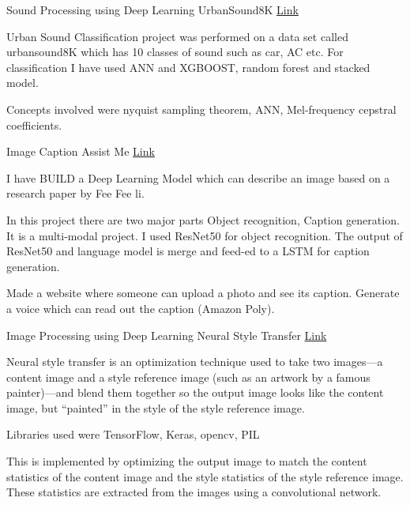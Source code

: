 \begin{cventries}
  \cventry
    {Sound Processing using Deep Learning} %
    {UrbanSound8K} %
    {\href{https://github.com/ravising-h/Urbansound8k}{Link}} %
    {} %
    {
      \begin{cvitems} %
        \item Urban Sound Classification project was performed on a data set called urbansound8K which has 10 classes of sound such as car, AC etc. For classification I have used ANN and XGBOOST, random forest and stacked model.
        \item  Concepts involved were nyquist sampling theorem, ANN, Mel-frequency cepstral coefficients.
      \end{cvitems}
    }
  \cventry
    {Image Caption} %
    {Assist Me} %
    {\href{https://github.com/ravising-h/AssistME}{Link}} %
    {} %
    {
      \begin{cvitems} %
       \item I have BUILD a Deep Learning Model which can describe an image based on a research paper by Fee Fee li.
        \item In this project there are two major parts Object recognition, Caption generation. It is a multi-modal project. I used ResNet50 for object  recognition.  The output  of ResNet50 and language model is merge and feed-ed to a LSTM for caption generation.
        \item  Made a website where someone can upload a photo and see its caption. Generate a voice which can read out the caption (Amazon Poly).
      \end{cvitems}
    }
    

  \cventry
    {Image Processing using Deep Learning} %
    {Neural Style Transfer} %
    {\href{https://github.com/ravising-h/Neural-Style-Transfer}{Link}} %
    {} %
    {
      \begin{cvitems} %
        \item Neural style transfer is an optimization technique used to take two images—a content image and a style reference image (such as an artwork by a famous painter)—and blend them together so the output image looks like the content image, but “painted” in the style of the style reference image.
        \item  Libraries used were  TensorFlow, Keras,  opencv, PIL
        \item  This is implemented by optimizing the output image to match the content statistics of the content image and the style statistics of the style reference image. These statistics are extracted from the images using a convolutional network.
      \end{cvitems}
    }
 

\end{cventries}

